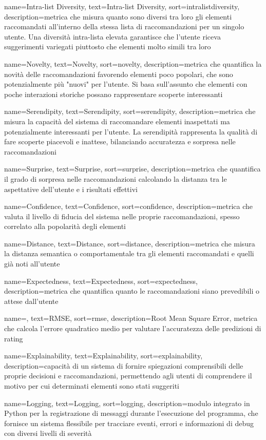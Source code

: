  {
    name=Intra-list Diversity,
    text=Intra-list Diversity,
    sort=intralistdiversity,
    description={metrica che misura quanto sono diversi tra loro gli elementi raccomandati all'interno della stessa lista di raccomandazioni per un singolo utente. Una diversità intra-lista elevata garantisce che l'utente riceva suggerimenti variegati piuttosto che elementi molto simili tra loro}
}

 {
    name=Novelty,
    text=Novelty,
    sort=novelty,
    description={metrica che quantifica la novità delle raccomandazioni favorendo elementi poco popolari, che sono potenzialmente più "nuovi" per l'utente. Si basa sull'assunto che elementi con poche interazioni storiche possano rappresentare scoperte interessanti}
}

 {
    name=Serendipity,
    text=Serendipity,
    sort=serendipity,
    description={metrica che misura la capacità del sistema di raccomandare elementi inaspettati ma potenzialmente interessanti per l'utente. La serendipità rappresenta la qualità di fare scoperte piacevoli e inattese, bilanciando accuratezza e sorpresa nelle raccomandazioni}
}

 {
    name=Surprise,
    text=Surprise,
    sort=surprise,
    description={metrica che quantifica il grado di sorpresa nelle raccomandazioni calcolando la distanza tra le aspettative dell'utente e i risultati effettivi}
}

 {
    name=Confidence,
    text=Confidence,
    sort=confidence,
    description={metrica che valuta il livello di fiducia del sistema nelle proprie raccomandazioni, spesso correlato alla popolarità degli elementi}
}

 {
    name=Distance,
    text=Distance,
    sort=distance,
    description={metrica che misura la distanza semantica o comportamentale tra gli elementi raccomandati e quelli già noti all'utente}
}

 {
    name=Expectedness,
    text=Expectedness,
    sort=expectedness,
    description={metrica che quantifica quanto le raccomandazioni siano prevedibili o attese dall'utente}
}

 {
    name=,
    text=RMSE,
    sort=rmse,
    description={Root Mean Square Error, metrica che calcola l'errore quadratico medio per valutare l'accuratezza delle predizioni di rating}
}

 {
    name=Explainability,
    text=Explainability,
    sort=explainability,
    description={capacità di un sistema di fornire spiegazioni comprensibili delle proprie decisioni e raccomandazioni, permettendo agli utenti di comprendere il motivo per cui determinati elementi sono stati suggeriti}
}

 {
    name=Logging,
    text=Logging,
    sort=logging,
    description={modulo integrato in Python per la registrazione di messaggi durante l'esecuzione del programma, che fornisce un sistema flessibile per tracciare eventi, errori e informazioni di debug con diversi livelli di severità}
}
